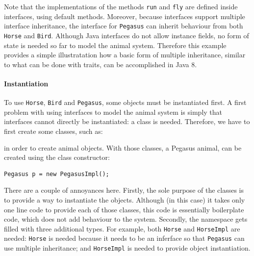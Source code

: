 
Note that the implementations of the methods \texttt{run}
and \texttt{fly} are defined inside interfaces, using default
methods. Moreover, because interfaces support multiple interface
inheritance, the interface for \texttt{Pegasus} can inherit behaviour
from both \texttt{Horse} and \texttt{Bird}. Although Java interfaces
do not allow instance fields, no form of state is needed so far to
model the animal system.  Therefore this example provides a simple
illustratation how a basic form of multiple inheritance, similar to
what can be done with traits, can be accomplished in Java 8.


\paragraph{Instantiation}
To use \texttt{Horse}, \texttt{Bird} and \texttt{Pegasus}, some
objects must be instantiated first. A first problem with using
interfaces to model the animal system is simply that interfaces 
cannot directly be instantiated: a class is needed. Therefore, we have
to first create some classes, such as: 


\noindent in order to create animal objects. With those classes, 
a Pegasus animal, can be created using the class constructor:

\begin{lstlisting}
Pegasus p = new PegasusImpl();
\end{lstlisting}

\noindent There are a couple of annoyances here. Firstly, the sole
purpose of the classes is to provide a way to instantiate the
objects. Although (in this case) it takes only one line code to
provide each of those classes, this code is essentially boilerplate
code, which does not add behaviour to the system. Secondly, 
the namespace gets filled with three additional types. For example, 
both \texttt{Horse} and \texttt{HorseImpl} are needed: \texttt{Horse}
is needed because it needs to be an inferface so that \texttt{Pegasus}
can use multiple inheritance; and \texttt{HorseImpl} is needed to
provide object instantiation. 

